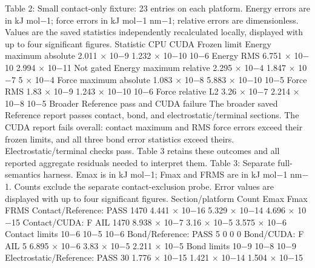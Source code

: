 \documentclass[11pt]{article}
\begin{document}
Table 2: Small contact-only fixture: 23 entries on each platform. Energy errors are in kJ mol\ensuremath{-}1;
force errors in kJ mol\ensuremath{-}1 nm\ensuremath{-}1; relative errors are dimensionless. Values are the saved statistics
independently recalculated locally, displayed with up to four significant figures.
Statistic CPU CUDA Frozen limit
Energy maximum absolute 2.011 \ensuremath{\times} 10\ensuremath{-}9 1.232 \ensuremath{\times} 10\ensuremath{-}10 10\ensuremath{-}6
Energy RMS 6.751 \ensuremath{\times} 10\ensuremath{-}10 2.994 \ensuremath{\times} 10\ensuremath{-}11 Not gated
Energy maximum relative 2.295 \ensuremath{\times} 10\ensuremath{-}4 1.847 \ensuremath{\times} 10\ensuremath{-}7 5 \ensuremath{\times} 10\ensuremath{-}4
Force maximum absolute 1.083 \ensuremath{\times} 10\ensuremath{-}8 5.883 \ensuremath{\times} 10\ensuremath{-}10 10\ensuremath{-}5
Force RMS 1.83 \ensuremath{\times} 10\ensuremath{-}9 1.243 \ensuremath{\times} 10\ensuremath{-}10 10\ensuremath{-}6
Force relative L2 3.26 \ensuremath{\times} 10\ensuremath{-}7 2.214 \ensuremath{\times} 10\ensuremath{-}8 10\ensuremath{-}5
Broader Reference pass and CUDA failure
The broader saved Reference report passes contact, bond, and electrostatic/terminal sections. The
CUDA report fails overall: contact maximum and RMS force errors exceed their frozen limits, and
all three bond error statistics exceed theirs. Electrostatic/terminal checks pass. Table 3 retains
these outcomes and all reported aggregate residuals needed to interpret them.
Table 3: Separate full-semantics harness. Emax is in kJ mol\ensuremath{-}1; Fmax and FRMS are in kJ mol\ensuremath{-}1 nm\ensuremath{-}1.
Counts exclude the separate contact-exclusion probe. Error values are displayed with up to four
significant figures.
Section/platform Count Emax Fmax FRMS
Contact/Reference: PASS 1470 4.441 \ensuremath{\times} 10\ensuremath{-}16 5.329 \ensuremath{\times} 10\ensuremath{-}14 4.696 \ensuremath{\times} 10\ensuremath{-}15
Contact/CUDA: F AIL 1470 8.938 \ensuremath{\times} 10\ensuremath{-}7 3.16 \ensuremath{\times} 10\ensuremath{-}5 3.575 \ensuremath{\times} 10\ensuremath{-}6
Contact limits 10\ensuremath{-}6 10\ensuremath{-}5 10\ensuremath{-}6
Bond/Reference: PASS 5 0 0 0
Bond/CUDA: F AIL 5 6.895 \ensuremath{\times} 10\ensuremath{-}6 3.83 \ensuremath{\times} 10\ensuremath{-}5 2.211 \ensuremath{\times} 10\ensuremath{-}5
Bond limits 10\ensuremath{-}9 10\ensuremath{-}8 10\ensuremath{-}9
Electrostatic/Reference: PASS 30 1.776 \ensuremath{\times} 10\ensuremath{-}15 1.421 \ensuremath{\times} 10\ensuremath{-}14 1.504 \ensuremath{\times} 10\ensuremath{-}15
\end{document}
